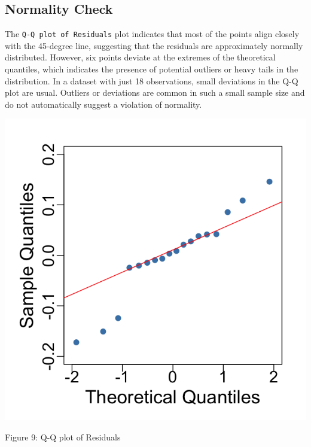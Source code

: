 \documentclass[
  12pt,
]{article}
\begin{document}
\vspace{-1em}

\subsection{Normality Check}\label{normality-check}

\noindent

\begin{minipage}{0.65\textwidth}
\justifying

The \texttt{Q-Q plot of Residuals} plot indicates that most of the points align closely with the 45-degree line, suggesting that the residuals are approximately normally distributed. However, six points deviate at the extremes of the theoretical quantiles, which indicates the presence of potential outliers or heavy tails in the distribution. In a dataset with just 18 observations, small deviations in the Q-Q plot are usual. Outliers or deviations are common in such a small sample size and do not automatically suggest a violation of normality.
\end{minipage}
\hfill
\begin{minipage}{0.33\textwidth}
\centering
\vspace{-2em}  %
\includegraphics[width=0.9\linewidth]{figures/qqplot_residuals.png}
\vspace{-1em}
\parbox{\linewidth}{\fontsize{12}{14}\selectfont Figure 9: Q-Q plot of Residuals}

\end{minipage}
\end{document}
